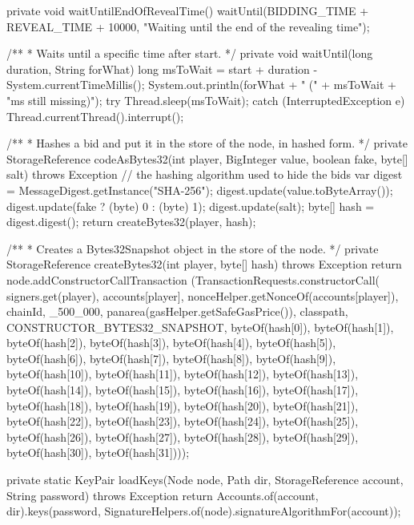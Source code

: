 \begin{codebox}
\begin{javalst}
{  private void waitUntilEndOfRevealTime() {
    waitUntil(BIDDING_TIME + REVEAL_TIME + 10000, "Waiting until the end of the revealing time");
  }

  /**
  * Waits until a specific time after start.
  */
  private void waitUntil(long duration, String forWhat) {
    long msToWait = start + duration - System.currentTimeMillis();
    System.out.println(forWhat + " (" + msToWait + "ms still missing)");
	try {
      Thread.sleep(msToWait);
    }
    catch (InterruptedException e) {
      Thread.currentThread().interrupt();
    }
  }

  /**
  * Hashes a bid and put it in the store of the node, in hashed form.
  */
  private StorageReference codeAsBytes32(int player, BigInteger value, boolean fake, byte[] salt)
      throws Exception {
	// the hashing algorithm used to hide the bids
	var digest = MessageDigest.getInstance("SHA-256");
    digest.update(value.toByteArray());
    digest.update(fake ? (byte) 0 : (byte) 1);
    digest.update(salt);
    byte[] hash = digest.digest();
    return createBytes32(player, hash);
  }

  /**
  * Creates a Bytes32Snapshot object in the store of the node.
  */
  private StorageReference createBytes32(int player, byte[] hash) throws Exception {
    return node.addConstructorCallTransaction
      (TransactionRequests.constructorCall(
      signers.get(player),
      accounts[player],
      nonceHelper.getNonceOf(accounts[player]), chainId,
      _500_000, panarea(gasHelper.getSafeGasPrice()),
      classpath, CONSTRUCTOR_BYTES32_SNAPSHOT,
      byteOf(hash[0]), byteOf(hash[1]),
      byteOf(hash[2]), byteOf(hash[3]),
      byteOf(hash[4]), byteOf(hash[5]),
      byteOf(hash[6]), byteOf(hash[7]),
      byteOf(hash[8]), byteOf(hash[9]),
      byteOf(hash[10]), byteOf(hash[11]),
      byteOf(hash[12]), byteOf(hash[13]),
      byteOf(hash[14]), byteOf(hash[15]),
      byteOf(hash[16]), byteOf(hash[17]),
      byteOf(hash[18]), byteOf(hash[19]),
      byteOf(hash[20]), byteOf(hash[21]),
      byteOf(hash[22]), byteOf(hash[23]),
      byteOf(hash[24]), byteOf(hash[25]),
      byteOf(hash[26]), byteOf(hash[27]),
      byteOf(hash[28]), byteOf(hash[29]),
      byteOf(hash[30]), byteOf(hash[31])));
  }

  private static KeyPair loadKeys(Node node, Path dir, StorageReference account, String password)
      throws Exception {
    return Accounts.of(account, dir).keys(password,
      SignatureHelpers.of(node).signatureAlgorithmFor(account));
  }
}
\end{javalst}\end{codebox}

